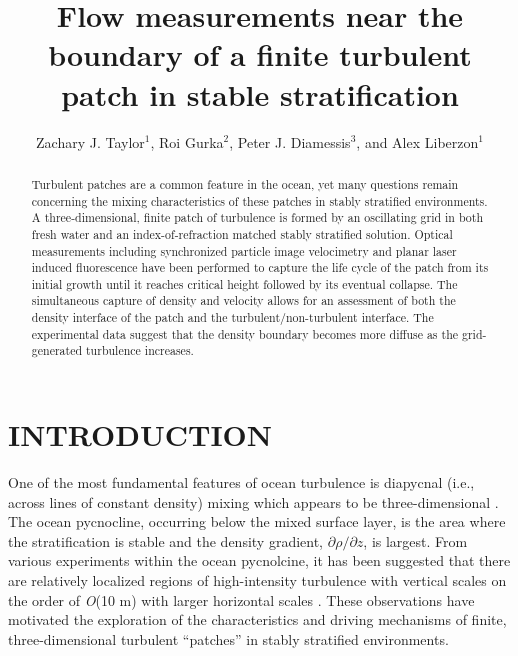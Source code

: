 \documentclass{piv13-abstract}
\begin{document}
\title{Flow measurements near the boundary of a finite turbulent patch in stable stratification}

\author{Zachary J. Taylor$^1$, Roi Gurka$^2$, Peter J. Diamessis$^3$, and Alex Liberzon$^1$}

\maketitle

\begin{abstract}

Turbulent patches are a common feature in the ocean, yet many questions remain concerning the mixing characteristics of these patches in stably stratified environments. A three-dimensional, finite patch of turbulence is formed by an oscillating grid in both fresh water and an index-of-refraction matched stably stratified solution. Optical measurements including synchronized particle image velocimetry and planar laser induced fluorescence have been performed to capture the life cycle of the patch from its initial growth until it reaches critical height followed by its eventual collapse. The simultaneous capture of density and velocity allows for an assessment of both the density interface of the patch and the turbulent/non-turbulent interface. The experimental data suggest that the density boundary becomes more diffuse as the grid-generated turbulence increases.

\end{abstract}

\section{INTRODUCTION}
\label{sec:intro}

One of the most fundamental features of ocean turbulence is diapycnal (i.e., across lines of constant density) mixing which appears to be three-dimensional \cite{bookThorpe2005}. The ocean pycnocline, occurring below the mixed surface layer, is the area where the stratification is stable and the density gradient, $\partial\rho/\partial z$, is largest.  From various experiments within the ocean pycnolcine, it has been suggested that there are relatively localized regions of high-intensity turbulence with vertical scales on the order of \emph{O}(10 m) with larger horizontal scales \cite{Nasmyth1970}.  These observations have motivated the exploration of the characteristics and driving mechanisms of finite, three-dimensional turbulent ``patches'' in stably stratified environments. 
\end{document}
